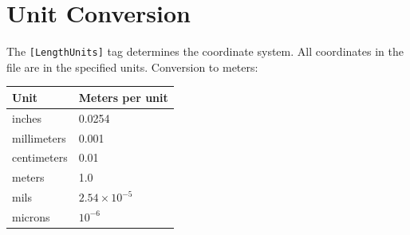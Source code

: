 \documentclass[11pt]{article}
\begin{document}
\section{Unit Conversion}

The \verb|[LengthUnits]| tag determines the coordinate system.  All
coordinates in the file are in the specified units.  Conversion to
meters:

\begin{center}
\begin{tabular}{ll}
\toprule
Unit & Meters per unit \\
\midrule
inches      & 0.0254 \\
millimeters & 0.001 \\
centimeters & 0.01 \\
meters      & 1.0 \\
mils        & $2.54 \times 10^{-5}$ \\
microns     & $10^{-6}$ \\
\bottomrule
\end{tabular}
\end{center}
\end{document}
